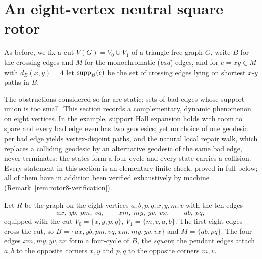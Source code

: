 
\section{An eight-vertex neutral square rotor}\label{sec:rotor8}

As before, we fix a cut \(V(G)=V_0\mathbin{\dot\cup}V_1\) of a
triangle-free graph \(G\), write \(B\) for the crossing edges and \(M\)
for the monochromatic (\emph{bad}) edges, and for \(e=xy\in M\) with
\(d_B(x,y)=4\) let \(\operatorname{supp}_B(e)\) be the set of crossing edges lying on
shortest \(x\)-\(y\) paths in \(B\).

The obstructions considered so far are static: sets of bad edges whose
support union is too small. This section records a complementary,
dynamic phenomenon on eight vertices. In the example, support Hall
expansion holds with room to spare and every bad edge even has two
geodesics; yet no choice of one geodesic per bad edge yields
vertex-disjoint paths, and the natural local repair walk, which replaces
a colliding geodesic by an alternative geodesic of the same bad edge,
never terminates: the states form a four-cycle and every state carries a
collision. Every statement in this section is an
elementary finite check, proved in full below; all of them have in
addition been verified exhaustively by machine
(Remark~\ref{rem:rotor8-verification}).

\begin{definition}\label{def:rotor8}
Let \(R\) be the graph on the eight vertices \(a,b,p,q,x,y,m,v\) with
the ten edges
\[
 ax,\ yb,\ pm,\ vq,\qquad xm,\ my,\ yv,\ vx,\qquad ab,\ pq,
\]
equipped with the cut \(V_0=\{x,y,p,q\}\), \(V_1=\{m,v,a,b\}\).
The first eight edges cross the cut, so
\(B=\{ax,yb,pm,vq,xm,my,yv,vx\}\) and \(M=\{ab,pq\}\).
The four edges \(xm,my,yv,vx\) form a four-cycle of \(B\), the
\emph{square}; the pendant edges attach \(a,b\) to the opposite corners
\(x,y\) and \(p,q\) to the opposite corners \(m,v\).
\end{definition}


